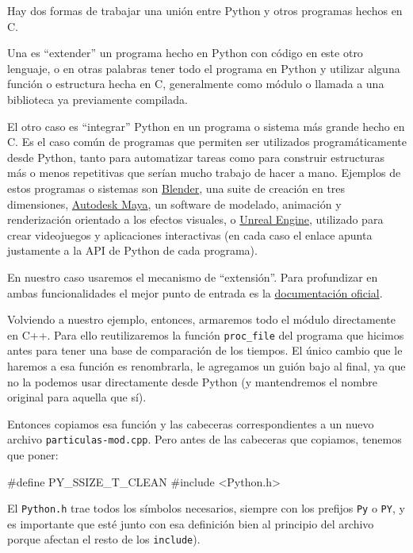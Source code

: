 Hay dos formas de trabajar una unión entre Python y otros programas hechos en C. 

Una es ``extender'' un programa hecho en Python con código en este otro lenguaje, o en otras palabras tener todo el programa en Python y utilizar alguna función o estructura hecha en C, generalmente como módulo o llamada a una biblioteca ya previamente compilada.

El otro caso es ``integrar'' Python en un programa o sistema más grande hecho en C. Es el caso común de programas que permiten ser utilizados programáticamente desde Python, tanto para automatizar tareas como para construir estructuras más o menos repetitivas que serían mucho trabajo de hacer a mano. Ejemplos de estos programas o sistemas son \href{https://docs.blender.org/api/current/}{Blender}, una suite de creación en tres dimensiones, \href{https://help.autodesk.com/cloudhelp/2023/ENU/Maya-Tech-Docs/CommandsPython/}{Autodesk Maya}, un software de modelado, animación y renderización orientado a los efectos visuales, o \href{https://docs.unrealengine.com/4.27/en-US/PythonAPI/}{Unreal Engine}, utilizado para crear videojuegos y aplicaciones interactivas (en cada caso el enlace apunta justamente a la API de Python de cada programa).

En nuestro caso usaremos el mecanismo de ``extensión''. Para profundizar en ambas funcionalidades el mejor punto de entrada es la \href{https://docs.python.org/es/dev/extending/index.html}{documentación oficial}.

Volviendo a nuestro ejemplo, entonces, armaremos todo el módulo directamente en C++. Para ello reutilizaremos la función \texttt{proc\_file} del programa que hicimos antes para tener una base de comparación de los tiempos. El único cambio que le haremos a esa función es renombrarla, le agregamos un guión bajo al final, ya que no la podemos usar directamente desde Python (y mantendremos el nombre original para aquella que sí).

Entonces copiamos esa función y las cabeceras correspondientes a un nuevo archivo \texttt{particulas-mod.cpp}. Pero antes de las cabeceras que copiamos, tenemos que poner:

\begin{cpp}
#define PY_SSIZE_T_CLEAN
#include <Python.h>
\end{cpp}

El \texttt{Python.h} trae todos los símbolos necesarios, siempre con los prefijos \texttt{Py} o \texttt{PY}, y es importante que esté junto con esa definición bien al principio del archivo porque afectan el resto de los \texttt{include}).

